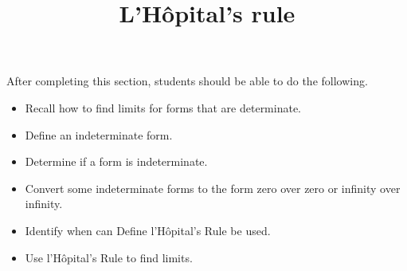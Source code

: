 \documentclass{ximera}
\title{L'H\^{o}pital's rule}
\begin{document}
\begin{abstract}
\end{abstract}

\maketitle

\begin{sectionOutcomes}

After completing this section, students should be able to do the following.

\begin{itemize}
	\item Recall how to find limits for forms that are determinate.
	\item Define an indeterminate form.
	\item Determine if a form is indeterminate.
	\item Convert some indeterminate forms to the form zero over zero
          or infinity over infinity.
	\item Identify when  can  Define l'H\^{o}pital's Rule be used.
	\item Use l'H\^{o}pital's Rule to find limits.
\end{itemize}

\end{sectionOutcomes}
\end{document}
